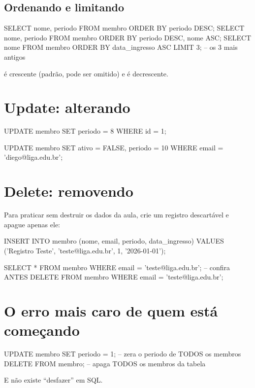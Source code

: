 \subsection{Ordenando e limitando}

\begin{sqlcode}
SELECT nome, periodo FROM membro ORDER BY periodo DESC;
SELECT nome, periodo FROM membro ORDER BY periodo DESC, nome ASC;
SELECT nome FROM membro ORDER BY data_ingresso ASC LIMIT 3;  -- os 3 mais antigos
\end{sqlcode}

 é crescente (padrão, pode ser omitido) e  é
decrescente.

\section{Update: alterando}

\begin{sqlcode}
UPDATE membro
SET    periodo = 8
WHERE  id = 1;

UPDATE membro
SET    ativo = FALSE, periodo = 10
WHERE  email = 'diego@liga.edu.br';
\end{sqlcode}

\section{Delete: removendo}

Para praticar sem destruir os dados da aula, crie um registro descartável e
apague apenas ele:

\begin{sqlcode}
INSERT INTO membro (nome, email, periodo, data_ingresso)
VALUES ('Registro Teste', 'teste@liga.edu.br', 1, '2026-01-01');

SELECT * FROM membro WHERE email = 'teste@liga.edu.br';   -- confira ANTES
DELETE FROM membro WHERE email = 'teste@liga.edu.br';
\end{sqlcode}

\section{O erro mais caro de quem está começando}
\label{sec:where-ausente}

\begin{aviso}
\begin{sqlcode}
UPDATE membro SET periodo = 1;   -- zera o periodo de TODOS os membros
DELETE FROM membro;              -- apaga TODOS os membros da tabela
\end{sqlcode}
E não existe ``desfazer'' em SQL.
\end{aviso}

